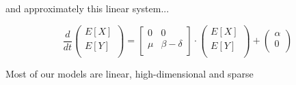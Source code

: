 \documentclass{beamer}
\begin{document}
\begin{frame}
    and approximately this linear system...

    \begin{equation*}
        \frac{d}{dt} 
        \begin{pmatrix}
            E[X] \\
            E[Y] \\
        \end{pmatrix}
        = 
        \begin{bmatrix}
            0 & 0 \\
            \mu & \beta - \delta \\
        \end{bmatrix}
        \cdot
        \begin{pmatrix}
            E[X] \\
            E[Y] \\
        \end{pmatrix}
        +
        \begin{pmatrix}
            \alpha \\
            0 \\
        \end{pmatrix}
    \end{equation*}

\begin{center}
    \small{Most of our models are linear, high-dimensional and sparse\footnotemark}
\end{center}
\end{frame}
\end{document}

